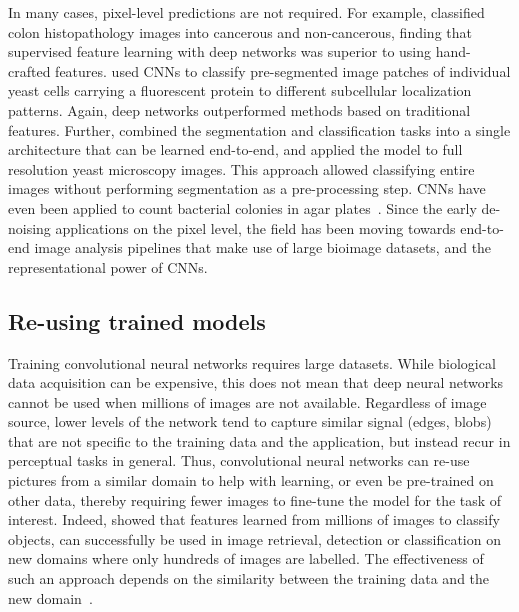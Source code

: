 In many cases, pixel-level predictions are not required. For example, \citet{xu_deep_2014} classified colon histopathology images into cancerous and non-cancerous, finding that supervised feature learning with deep networks was superior to using hand-crafted features. \citet{parnamaa_accurate_2016} used CNNs to classify pre-segmented image patches of individual yeast cells carrying a fluorescent protein to different subcellular localization patterns. Again, deep networks outperformed methods based on traditional features. Further, \citet{kraus_classifying_2015} combined the segmentation and classification tasks into a single architecture that can be learned end-to-end, and applied the model to full resolution yeast microscopy images. This approach allowed classifying entire images without performing segmentation as a pre-processing step. CNNs have even been applied to count bacterial colonies in agar plates~\citep{ferrari_bacterial_2015}. Since the early de-noising applications on the pixel level, the field has been moving towards end-to-end image analysis pipelines that make use of large bioimage datasets, and the representational power of CNNs.


\subsection{Re-using trained models}

Training convolutional neural networks requires large datasets. While biological data acquisition can be expensive, this does not mean that deep neural networks cannot be used when millions of images are not available. Regardless of image source, lower levels of the network tend to capture similar signal (edges, blobs) that are not specific to the training data and the application, but instead recur in perceptual tasks in general. Thus, convolutional neural networks can re-use pictures from a similar domain to help with learning, or even be pre-trained on other data, thereby requiring fewer images to fine-tune the model for the task of interest. Indeed, \citet{donahue_decaf:_2013} showed that features learned from millions of images to classify objects, can successfully be used in image retrieval, detection or classification on new domains where only hundreds of images are labelled. The effectiveness of such an approach depends on the similarity between the training data and the new domain~\citep{ghahramani_how_2014}.

